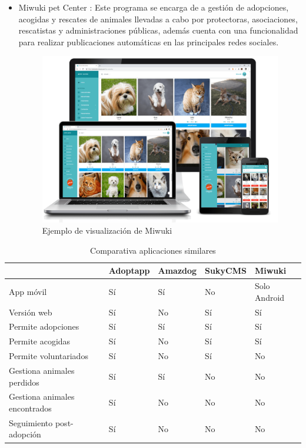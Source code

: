 \begin{itemize}
	\item Miwuki pet Center \cite{miwuki}: Este programa se encarga de a gestión de adopciones, acogidas y rescates de animales llevadas a cabo por protectoras, asociaciones, rescatistas y administraciones públicas, además cuenta con una funcionalidad para realizar publicaciones automáticas en las principales redes sociales.
	 
\begin{figure}[H]
	\centering
	\includegraphics[width=0.7\linewidth]{"Sprint 0/miwuki"}
	\caption{Ejemplo de visualización de Miwuki}
	\label{fig:miwuki}
\end{figure}

\end{itemize}

\begin{table}[H] %
	\centering
	\begin{tabular}{|p{3cm}|l|l|l|l|} \hline 
		& \textbf{Adoptapp} & \textbf{Amazdog} & \textbf{SukyCMS} & \textbf{Miwuki} \\ \hline
		App móvil & Sí & Sí & No & Solo Android \\ \hline
		Versión web	& Sí & No & Sí &  Sí \\ \hline
		Permite adopciones & Sí & Sí & Sí & Sí \\ \hline
		Permite acogidas & Sí & No & Sí & Sí \\ \hline
		Permite voluntariados & Sí & No & Sí & No \\ \hline
		Gestiona animales perdidos & Sí & Sí & No & No \\ \hline
		Gestiona animales encontrados & Sí & No & No & No \\ \hline
		Seguimiento post-adopción & Sí & No & No & No \\ \hline
		
    \end{tabular}
		\caption{Comparativa aplicaciones similares}
		\label{tab:appsSimilares}
	\end{table}